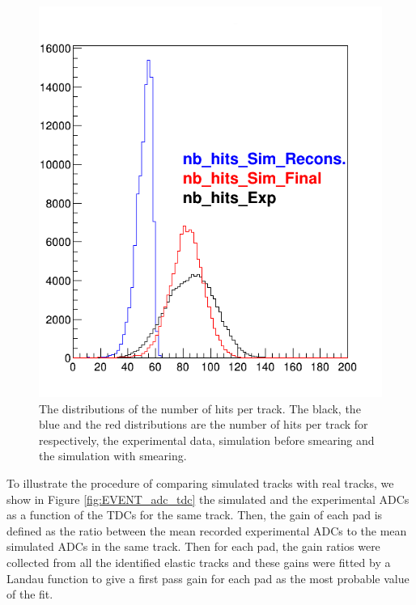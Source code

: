 \begin{figure}[tpb]
\centering
\includegraphics[scale=0.35]{fig_rtpc/NNb_hits.png}
\caption{The distributions of the number of hits per track. The black, the blue 
and the red distributions are the number of hits per track  for respectively, 
the experimental data, simulation before smearing and the simulation with 
smearing.}
\label{fig:NNb_hits}
\end{figure}

To illustrate the procedure of comparing simulated tracks with real tracks,
we show in Figure \ref{fig:EVENT_adc_tdc} the simulated and the experimental 
ADCs as a function of the TDCs for the same track. Then, the gain of each pad 
is defined as the ratio between the mean recorded experimental ADCs to the mean 
simulated ADCs in the same track. Then for each pad, the gain ratios were 
collected from all the identified elastic tracks and these gains were fitted by 
a Landau function to give a first pass gain for each pad as the most probable 
value of the fit. 

